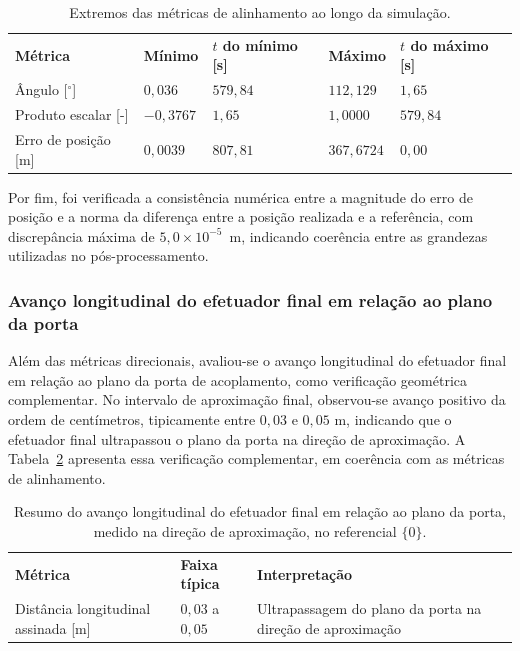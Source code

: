 \begin{table}[H]
\centering
\caption{Extremos das métricas de alinhamento ao longo da simulação.}
\label{tab_cap4_alinhamento_extremos}
\begin{tabularx}{\linewidth}{|
  >{\centering\arraybackslash}X|
  >{\centering\arraybackslash}X|
  >{\centering\arraybackslash}X|
  >{\centering\arraybackslash}X|
  >{\centering\arraybackslash}X|}
\hline
\textbf{Métrica} &
\textbf{Mínimo} &
\textbf{$t$ do mínimo [s]} &
\textbf{Máximo} &
\textbf{$t$ do máximo [s]} \\
\hhline{|=|=|=|=|=|}
Ângulo [${}^\circ$] & $0{,}036$ & $579{,}84$ & $112{,}129$ & $1{,}65$ \\
\hline
Produto escalar [-] & $-0{,}3767$ & $1{,}65$ & $1{,}0000$ & $579{,}84$ \\
\hline
Erro de posição [m] & $0{,}0039$ & $807{,}81$ & $367{,}6724$ & $0{,}00$ \\
\hline
\end{tabularx}
\end{table}


Por fim, foi verificada a consistência numérica entre a magnitude do erro de posição e a norma da diferença entre a posição realizada e a referência, com discrepância máxima de $5{,}0\times 10^{-5}$~m, indicando coerência entre as grandezas utilizadas no pós-processamento.

\subsubsection{Avanço longitudinal do efetuador final em relação ao plano da porta}
\label{subsubsec_cap4_alinhamento_avanco_normal}

Além das métricas direcionais, avaliou-se o avanço longitudinal do efetuador final em relação ao plano da porta de acoplamento, como verificação geométrica complementar.
No intervalo de aproximação final, observou-se avanço positivo da ordem de centímetros, tipicamente entre $0{,}03$ e $0{,}05$ m, indicando que o efetuador final ultrapassou o plano da porta na direção de aproximação. A Tabela~\ref{tab_cap4_alinhamento_avanco_normal} apresenta essa verificação complementar, em coerência com as métricas de alinhamento.

\begin{table}[H]
\centering
\caption{Resumo do avanço longitudinal do efetuador final em relação ao plano da porta, medido na direção de aproximação, no referencial $\{0\}$.}
\label{tab_cap4_alinhamento_avanco_normal}
\begin{tabularx}{\linewidth}{|
  >{\centering\arraybackslash}X|
  >{\centering\arraybackslash}X|
  >{\centering\arraybackslash}X|}
\hline
\textbf{Métrica} & \textbf{Faixa típica} & \textbf{Interpretação} \\
\hhline{|=|=|=|}
Distância longitudinal assinada [m] & $0{,}03$ a $0{,}05$ & Ultrapassagem do plano da porta na direção de aproximação \\
\hline
\end{tabularx}
\end{table}


